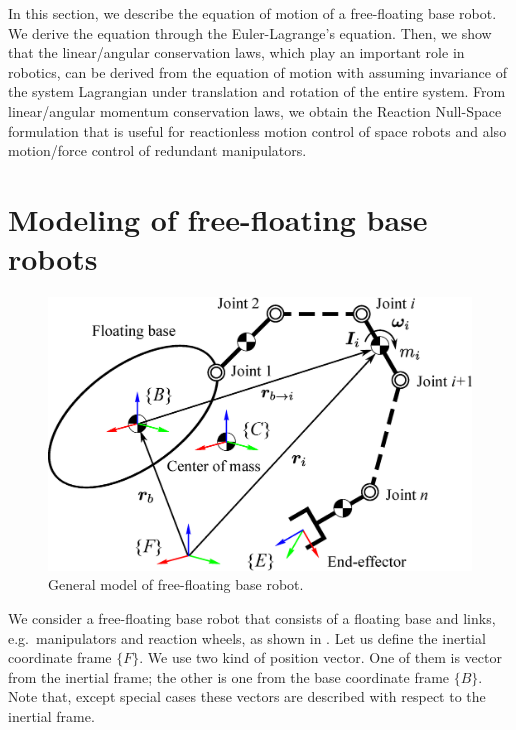 %


In this section, we describe the equation of motion of a free-floating base robot.
We derive the equation through the Euler-Lagrange's equation.
Then, we show that the linear/angular conservation laws, which play an important role in robotics,
can be derived from the equation of motion
with assuming invariance of the system Lagrangian under translation and rotation of the entire system.
From linear/angular momentum conservation laws,
we obtain the Reaction Null-Space formulation that 
is useful for reactionless motion control of space robots
and also motion/force control of redundant manipulators.


\section{Modeling of free-floating base robots}
%
\begin{figure}[t]
  \centering
  \includegraphics[width=0.7\linewidth]{fig/chapter2/FFSM.eps}
  \caption{General model of free-floating base robot.}
  \label{fig:MODEL_FFSM}
\end{figure}
%
We consider a free-floating base robot 
that consists of a floating base and links, e.g.\ manipulators and reaction wheels,
as shown in .
Let us define the inertial coordinate frame $\{F\}$.
We use two kind of position vector.
One of them is vector from the inertial frame;
the other is one from the base coordinate frame $\{B\}$.
Note that, except special cases these vectors are described with respect to the inertial frame.


